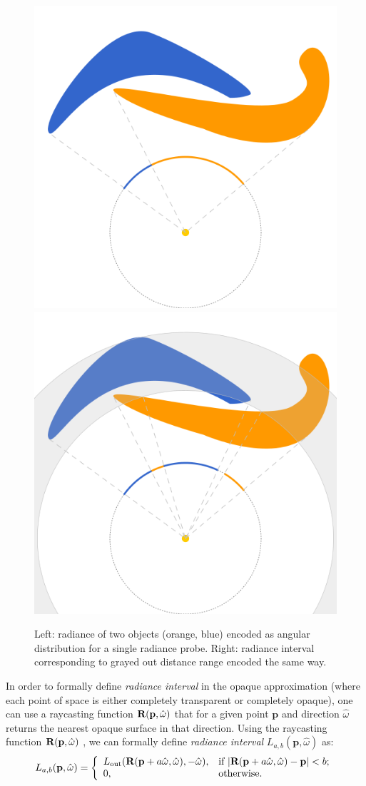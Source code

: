 \documentclass{jcgt}
\begin{document}
\begin{figure}[htb]
  \centering
  \includegraphics[width=0.49\columnwidth]{images/radiance probe.png}
  \includegraphics[width=0.49\columnwidth]{images/radiance interval probe.png}
  \caption{\label{fig:radiance_interval_probe}
  Left: radiance of two objects (orange, blue) encoded as angular distribution for a single radiance probe. Right: radiance interval corresponding to grayed out distance range encoded the same way.}
\end{figure}


 
In order to formally define \emph{radiance interval} in the opaque approximation (where each point of space is either completely transparent or completely opaque), one can use a raycasting function
$\textbf R(\textbf{p}, \hat \omega)$ that for a given point $\textbf{p}$ and direction $\hat \omega$ returns the nearest opaque surface in that direction. Using the raycasting function $\textbf R(\textbf{p}, \hat \omega)$ , we can formally define \emph{radiance interval} $L_{a,b}(\textbf{p}, \hat \omega)$ as:
\begin{equation}
  \label{eq:def_radiance_opaque}
  L_{a,b}(\textbf{p}, \hat \omega) = \left\{
    \begin{array}{ll}  
      L_{\mathrm{out}}(\textbf R(\textbf{p} + a\hat \omega, \hat \omega), -\hat \omega), & \text{if\ } |\textbf R(\textbf p + a \hat \omega, \hat \omega)-\textbf p| < b; \\
      0, & \text{otherwise}.
    \end{array}\right.
\end{equation}
\end{document}
